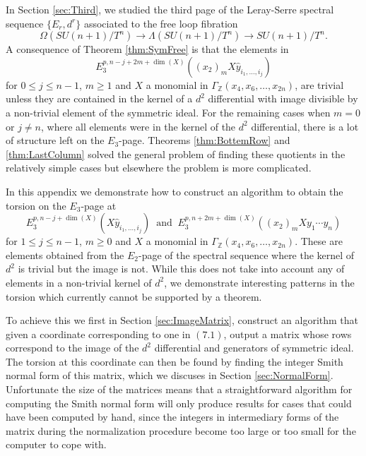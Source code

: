 \documentclass{article}
\theoremstyle{plain}
\theoremstyle{definition}
\numberwithin{thm}{section}
\begin{document}
		In Section \ref{sec:Third},
		we studied the third page of the Leray-Serre spectral sequence $\{ E_r,d^r \}$ associated to the free loop fibration
		\begin{equation*}
			\Omega(SU(n+1)/T^n)\to\Lambda(SU(n+1)/T^n)\to SU(n+1)/T^n.
		\end{equation*}
		A consequence of Theorem \ref{thm:SymFree} is that the elements in 
		\begin{equation*}
			E_3^{p,n-j+2m+\dim(X)}((x_2)_mX\hat{y}_{i_1,\dots,i_j})
		\end{equation*}
		for $0\leq j \leq n-1$, $m\geq 1$ and $X$ a monomial in $\Gamma_{\mathbb{Z}}(x_4,x_6,\dots,x_{2n})$,
		are trivial unless they are contained in the kernel of a $d^2$ differential with image divisible by a non-trivial element of the symmetric ideal. 
		For the remaining cases when $m=0$ or $j \neq n$, where all elements were in the kernel of the $d^2$ differential, there is a lot of structure left on the $E_3$-page.
		Theorems \ref{thm:BottemRow} and \ref{thm:LastColumn}
		solved the general problem of finding these quotients in the relatively simple cases but elsewhere the problem is more complicated. 
		
		In this appendix we demonstrate how to construct an algorithm to obtain the torsion on the $E_3$-page at 
		\begin{equation}\label{eq:Positions}
			E_3^{p,n-j+\dim(X)}(X\hat{y}_{i_1,\dots,i_j}) \;\; \text{and} \;\; E_3^{p,n+2m+\dim(X)}({(x_2)}_mXy_1\cdots y_n)
		\end{equation}
		for $1\leq j \leq n-1$, $m\geq 0$ and $X$ a monomial in $\Gamma_{\mathbb{Z}}(x_4,x_6,\dots,x_{2n})$.
		These are elements obtained from the $E_2$-page of the spectral sequence where the kernel of $d^2$ is trivial but the image is not.
		While this does not take into account any of elements in a non-trivial kernel of $d^2$, we demonstrate interesting patterns in the torsion 
		which currently cannot be supported by a theorem.
		
		To achieve this we first in Section \ref{sec:ImageMatrix}, construct an algorithm that given a coordinate corresponding to one in $(7.1)$,
		output a matrix whose rows correspond to the image of the $d^2$ differential and generators of symmetric ideal.
		The torsion at this coordinate can then be found by finding the integer Smith normal form of this matrix, which we discuses in Section \ref{sec:NormalForm}.
		Unfortunate the size of the matrices means that a straightforward algorithm for computing the Smith normal form will only produce results for cases that 
		could have been computed by hand, since the integers in intermediary forms of the matrix during the normalization procedure become
		too large or too small for the computer to cope with.
		
\end{document}
